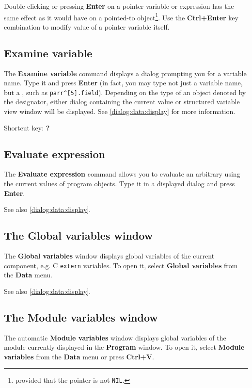 Double-clicking or pressing {\bf Enter} on a pointer variable
or expression has the same effect as it would have on a pointed-to
object\footnote{provided that the pointer is not {\tt NIL}.}.
Use the {\bf Ctrl+Enter} key combination to modify value of a
pointer variable itself.

\subsection{Examine variable}
\label{dialog:data:variable}

The {\bf Examine variable} command displays a dialog prompting you for
a variable name. Type it and press {\bf Enter} (in fact, you may type
not just a variable name, but a ,
such as \verb'parr^[5].field').
Depending on the type of an object denoted by the designator, either
dialog containing the current value or structured variable view window
will be displayed. See \ref{dialog:data:display} for more information.

Shortcut key: {\bf ?}

\subsection{Evaluate expression}
\label{dialog:data:expression}

The {\bf Evaluate expression} command allows you to evaluate an
arbitrary  using the current values
of program objects. Type it in a displayed dialog and press {\bf Enter}.

See also \ref{dialog:data:display}.

\subsection{The Global variables window}
\label{dialog:data:globals}

The {\bf Global variables} window displays global variables of the current
component, e.g. C \verb'extern' variables.
To open it, select {\bf Global variables} from the {\bf Data} menu.

See also \ref{dialog:data:display}.

\subsection{The Module variables window}
\label{dialog:data:module}

The automatic {\bf Module variables} window displays global variables of 
the module currently displayed in the {\bf Program} window.
To open it, select {\bf Module variables} from the {\bf Data} menu or
press {\bf Ctrl+V}.

